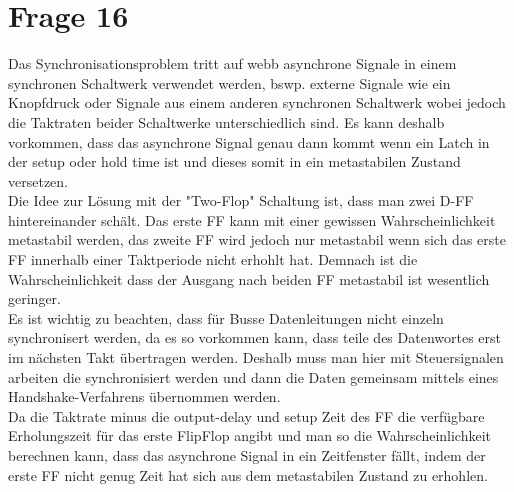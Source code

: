 \documentclass[a4paper]{scrartcl}
\begin{document}
\section*{Frage 16}
Das Synchronisationsproblem tritt auf webb asynchrone Signale in einem synchronen Schaltwerk verwendet werden, bswp. externe Signale wie ein Knopfdruck oder Signale aus einem anderen synchronen Schaltwerk wobei jedoch die Taktraten beider Schaltwerke unterschiedlich sind. Es kann deshalb vorkommen, dass das asynchrone Signal genau dann kommt wenn ein Latch in der setup oder hold time ist und dieses somit in ein metastabilen Zustand versetzen.\\
Die Idee zur Lösung mit der "Two-Flop" Schaltung ist, dass man zwei D-FF hintereinander schält. Das erste FF kann mit einer gewissen Wahrscheinlichkeit metastabil werden, das zweite FF wird jedoch nur metastabil wenn sich das erste FF innerhalb einer Taktperiode nicht erhohlt hat. Demnach ist die Wahrscheinlichkeit dass der Ausgang nach beiden FF metastabil ist wesentlich geringer.\\
Es ist wichtig zu beachten, dass für Busse Datenleitungen nicht einzeln synchronisert werden, da es so vorkommen kann, dass teile des Datenwortes erst im nächsten Takt übertragen werden. Deshalb muss man hier mit Steuersignalen arbeiten die synchronisiert werden und dann die Daten gemeinsam mittels eines Handshake-Verfahrens übernommen werden.\\
Da die Taktrate minus die output-delay und setup Zeit des FF die verfügbare Erholungszeit für das erste FlipFlop angibt und man so die Wahrscheinlichkeit berechnen kann, dass das asynchrone Signal in ein Zeitfenster fällt, indem der erste FF nicht genug Zeit hat sich aus dem metastabilen Zustand zu erhohlen.
~\\
~\\
\end{document}
